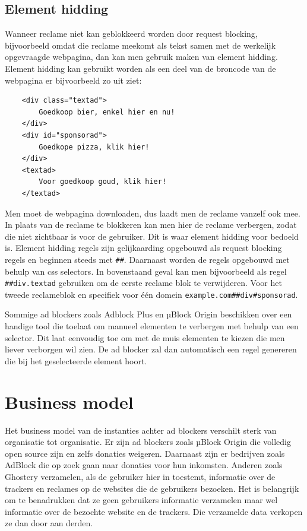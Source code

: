 \documentclass[pdftex,a4paper,12pt,twoside]{report}
\begin{document}
\subsection{ Element hidding}
\label{sec:Element hidding}
Wanneer reclame niet kan geblokkeerd worden door request blocking, bijvoorbeeld omdat die reclame meekomt als tekst samen met de werkelijk opgevraagde webpagina, dan kan men gebruik maken van element hidding. Element hidding kan gebruikt worden als een deel van de broncode van de webpagina er bijvoorbeeld zo uit ziet:
\lstset{language=Html,tabsize=2}  
\begin{lstlisting}
	<div class="textad">
		Goedkoop bier, enkel hier en nu!
	</div>
	<div id="sponsorad">
		Goedkope pizza, klik hier!
	</div>
	<textad>
		Voor goedkoop goud, klik hier!
	</textad>
\end{lstlisting}

Men moet de webpagina downloaden, dus laadt men de reclame vanzelf ook mee. In plaats van de reclame te blokkeren kan men hier de reclame verbergen, zodat die niet zichtbaar is voor de gebruiker. Dit is waar element hidding voor bedoeld is. Element hidding regels zijn gelijkaarding opgebouwd als request blocking regels en beginnen steeds met \texttt{\#\#}. Daarnaast worden de regels opgebouwd met behulp van css selectors. In bovenstaand geval kan men bijvoorbeeld als regel \texttt{\#\#div.textad} gebruiken om de eerste reclame blok te verwijderen. Voor het tweede reclameblok en specifiek voor één domein \texttt{example.com\#\#div\#sponsorad}.

Sommige ad blockers zoals Adblock Plus en µBlock Origin beschikken over een handige tool die toelaat om manueel elementen te verbergen met behulp van een selector. Dit laat eenvoudig toe om met de muis elementen te kiezen die men liever verborgen wil zien. De ad blocker zal dan automatisch een regel genereren die bij het geselecteerde element hoort.

\section{Business model}
\label{sec:Business model}
Het business model van de instanties achter ad blockers verschilt sterk van organisatie tot organisatie. Er zijn ad blockers zoals µBlock Origin die volledig open source zijn en zelfs donaties weigeren. Daarnaast zijn er bedrijven zoals AdBlock die op zoek gaan naar donaties voor hun inkomsten. Anderen zoals Ghostery verzamelen, als de gebruiker hier in toestemt, informatie over de trackers en reclames op de websites die de gebruikers bezoeken. Het is belangrijk om te benadrukken dat ze geen gebruikers informatie verzamelen maar wel informatie over de bezochte website en de trackers. Die verzamelde data verkopen ze dan door aan derden.
\end{document}

